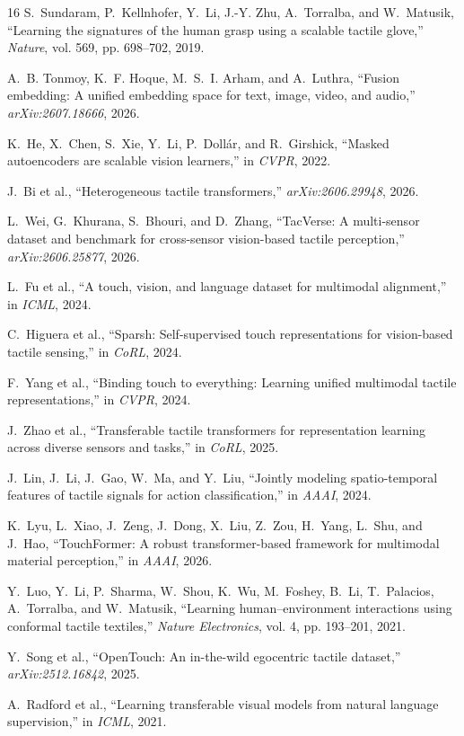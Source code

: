 \documentclass[conference]{IEEEtran}
\begin{document}
\newpage
\begin{thebibliography}{16}
S.~Sundaram, P.~Kellnhofer, Y.~Li, J.-Y. Zhu, A.~Torralba, and W.~Matusik,
``Learning the signatures of the human grasp using a scalable tactile glove,''
\emph{Nature}, vol. 569, pp. 698--702, 2019.

A.~B. Tonmoy, K.~F. Hoque, M.~S.~I. Arham, and A.~Luthra,
``Fusion embedding: A unified embedding space for text, image, video, and audio,''
\emph{arXiv:2607.18666}, 2026.

K.~He, X.~Chen, S.~Xie, Y.~Li, P.~Doll\'ar, and R.~Girshick,
``Masked autoencoders are scalable vision learners,'' in \emph{CVPR}, 2022.

J.~Bi et al., ``Heterogeneous tactile transformers,'' \emph{arXiv:2606.29948}, 2026.

L.~Wei, G.~Khurana, S.~Bhouri, and D.~Zhang,
``TacVerse: A multi-sensor dataset and benchmark for cross-sensor vision-based tactile
perception,'' \emph{arXiv:2606.25877}, 2026.

L.~Fu et al., ``A touch, vision, and language dataset for multimodal alignment,''
in \emph{ICML}, 2024.

C.~Higuera et al., ``Sparsh: Self-supervised touch representations for vision-based tactile
sensing,'' in \emph{CoRL}, 2024.

F.~Yang et al.,
``Binding touch to everything: Learning unified multimodal tactile representations,''
in \emph{CVPR}, 2024.

J.~Zhao et al.,
``Transferable tactile transformers for representation learning across diverse sensors
and tasks,'' in \emph{CoRL}, 2025.

J.~Lin, J.~Li, J.~Gao, W.~Ma, and Y.~Liu,
``Jointly modeling spatio-temporal features of tactile signals for action classification,''
in \emph{AAAI}, 2024.

K.~Lyu, L.~Xiao, J.~Zeng, J.~Dong, X.~Liu, Z.~Zou, H.~Yang, L.~Shu, and J.~Hao,
``TouchFormer: A robust transformer-based framework for multimodal material perception,''
in \emph{AAAI}, 2026.

Y.~Luo, Y.~Li, P.~Sharma, W.~Shou, K.~Wu, M.~Foshey, B.~Li, T.~Palacios, A.~Torralba, and
W.~Matusik,
``Learning human--environment interactions using conformal tactile textiles,''
\emph{Nature Electronics}, vol. 4, pp. 193--201, 2021.

Y.~Song et al., ``OpenTouch: An in-the-wild egocentric tactile dataset,''
\emph{arXiv:2512.16842}, 2025.

A.~Radford et al., ``Learning transferable visual models from natural language
supervision,'' in \emph{ICML}, 2021.

\end{thebibliography}
\end{document}

